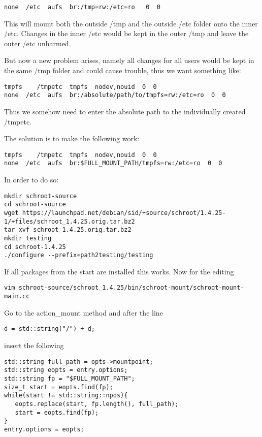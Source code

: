 \documentclass[a4paper]{book}
\begin{document}
\begin{verbatim}
none  /etc  aufs  br:/tmp=rw:/etc=ro   0  0
\end{verbatim}

This will mount both the outside /tmp and the outside /etc folder onto the
inner /etc. Changes in the inner /etc would be kept in the outer /tmp and leave
the outer /etc unharmed.

But now a new problem arises, namely all changes for all users would be kept in
the same /tmp folder and could cause trouble, thus we want something like:

\begin{verbatim}
tmpfs    /tmpetc  tmpfs  nodev,nouid  0  0
none  /etc  aufs  br:/absolute/path/to/tmpfs=rw:/etc=ro  0  0
\end{verbatim}

Thus we somehow need to enter the absolute path to the individually created /tmpetc.

The solution is to make the following work:

\begin{verbatim}
tmpfs    /tmpetc  tmpfs  nodev,nouid  0  0
none  /etc  aufs  br:$FULL_MOUNT_PATH/tmpfs=rw:/etc=ro  0  0
\end{verbatim}

In order to do so:

\begin{verbatim}
mkdir schroot-source
cd schroot-source
wget https://launchpad.net/debian/sid/+source/schroot/1.4.25-1/+files/schroot_1.4.25.orig.tar.bz2
tar xvf schroot_1.4.25.orig.tar.bz2
mkdir testing
cd schroot-1.4.25
./configure --prefix=path2testing/testing
\end{verbatim}

If all packages from the start are installed this works.
Now for the editing

\begin{verbatim}
vim schroot-source/schroot_1.4.25/bin/schroot-mount/schroot-mount-main.cc
\end{verbatim}

Go to the action\_mount method and after the line

\begin{verbatim}
d = std::string("/") + d;
\end{verbatim}

insert the following

\begin{verbatim}
std::string full_path = opts->mountpoint;
std::string eopts = entry.options;
std::string fp = "$FULL_MOUNT_PATH";
size_t start = eopts.find(fp);
while(start != std::string::npos){
   eopts.replace(start, fp.length(), full_path);
   start = eopts.find(fp);
}
entry.options = eopts;
\end{verbatim}
\end{document}
